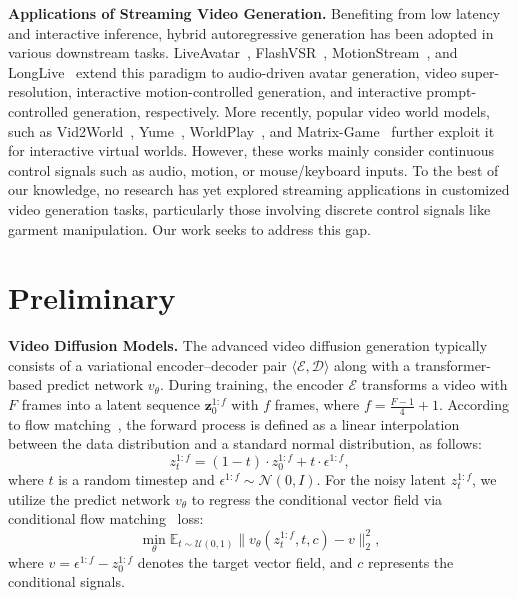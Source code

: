 \documentclass{llmxive}
\begin{document}
\noindent
\textbf{Applications of Streaming Video Generation.}
%
Benefiting from low latency and interactive inference, hybrid autoregressive generation has been adopted in various downstream tasks.
% 
LiveAvatar~\cite{huang2025live}, FlashVSR~\cite{zhuang2025flashvsr}, MotionStream~\cite{shin2025motionstream}, and LongLive~\cite{yang2025longlive} extend this paradigm to audio-driven avatar generation, video super-resolution, interactive motion-controlled generation, and interactive prompt-controlled generation, respectively.
% 
More recently, popular video world models, such as Vid2World~\cite{huang2025vid2world}, Yume~\cite{mao2025yume}, WorldPlay~\cite{sun2025worldplay}, and Matrix-Game~\cite{zhang2025matrix} further exploit it for interactive virtual worlds.
% 
However, these works mainly consider continuous control signals such as audio, motion, or mouse/keyboard inputs. To the best of our knowledge, no research has yet explored streaming applications in customized video generation tasks, particularly those involving discrete control signals like garment manipulation. Our work seeks to address this gap.





\section{Preliminary}


\noindent
\textbf{Video Diffusion Models.}
% 
The advanced video diffusion generation typically consists of a variational encoder–decoder pair $\langle \mathcal{E}, \mathcal{D} \rangle$ along with a transformer-based predict network $v_{\theta}$.
% 
During training, the encoder $\mathcal{E}$ transforms a video with $F$ frames into a latent sequence $\mathbf{z}_{0}^{1:f}$ with $f$ frames, where $f = \frac{F - 1}{4} + 1$.
% 
According to flow matching~\cite{lipman2022flow}, the forward process is defined as a linear interpolation between the data distribution and a standard normal distribution, as follows:
% 
\begin{equation}
    z_t^{1:f} = (1 - t) \cdot z_0^{1:f} + t \cdot \epsilon^{1:f},
\label{eq:1}
\end{equation}
% 
where $t$ is a random timestep and $\epsilon^{1:f} \sim \mathcal{N}(0, I)$.
For the noisy latent $z_t^{1:f}$, we utilize the predict network $v_{\theta}$ to regress the conditional vector field via conditional flow matching~\cite{lipman2022flow} loss:
% 
\begin{equation}
    \min_{\theta} \mathbb{E}_{t \sim \mathcal{U}(0,1)} \| v_{\theta}(z_{t}^{1:f}, t, c) - v \|_2^2,
\label{eq:2}
\end{equation}
% 
where $v = \epsilon^{1:f} - z_0^{1:f}$ denotes the target vector field, and $c$ represents the conditional signals.
\end{document}
